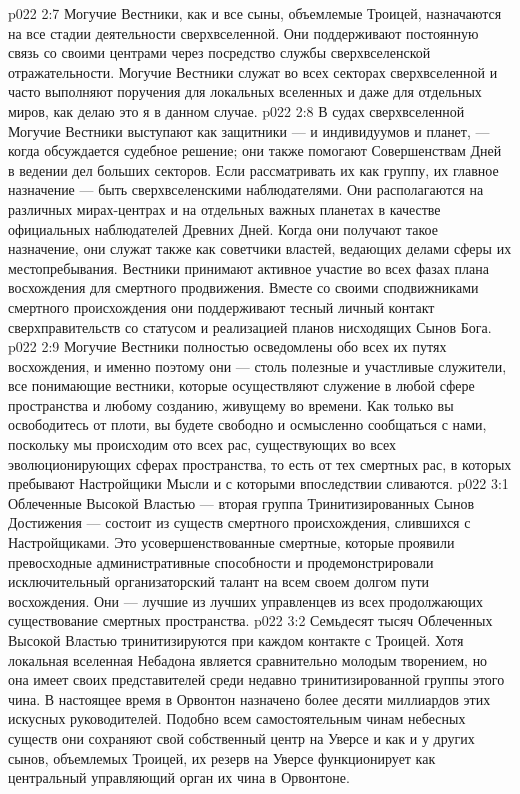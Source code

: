 \vs p022 2:7 \pc Могучие Вестники, как и все сыны, объемлемые Троицей, назначаются на все стадии деятельности сверхвселенной. Они поддерживают постоянную связь со своими центрами через посредство службы сверхвселенской отражательности. Могучие Вестники служат во всех секторах сверхвселенной и часто выполняют поручения для локальных вселенных и даже для отдельных миров, как делаю это я в данном случае.
\vs p022 2:8 В судах сверхвселенной Могучие Вестники выступают как защитники --- и индивидуумов и планет, --- когда обсуждается судебное решение; они также помогают Совершенствам Дней в ведении дел больших секторов. Если рассматривать их как группу, их главное назначение --- быть сверхвселенскими наблюдателями. Они располагаются на различных мирах\hyp{}центрах и на отдельных важных планетах в качестве официальных наблюдателей Древних Дней. Когда они получают такое назначение, они служат также как советчики властей, ведающих делами сферы их местопребывания. Вестники принимают активное участие во всех фазах плана восхождения для смертного продвижения. Вместе со своими сподвижниками смертного происхождения они поддерживают тесный личный контакт сверхправительств со статусом и реализацией планов нисходящих Сынов Бога.
\vs p022 2:9 Могучие Вестники полностью осведомлены обо всех их путях восхождения, и именно поэтому они --- столь полезные и участливые служители, все понимающие вестники, которые осуществляют служение в любой сфере пространства и любому созданию, живущему во времени. Как только вы освободитесь от плоти, вы будете свободно и осмысленно сообщаться с нами, поскольку мы происходим ото всех рас, существующих во всех эволюционирующих сферах пространства, то есть от тех смертных рас, в которых пребывают Настройщики Мысли и с которыми впоследствии сливаются.
\vs p022 3:1 Облеченные Высокой Властью --- вторая группа Тринитизированных Сынов Достижения --- состоит из существ смертного происхождения, слившихся с Настройщиками. Это усовершенствованные смертные, которые проявили превосходные административные способности и продемонстрировали исключительный организаторский талант на всем своем долгом пути восхождения. Они --- лучшие из лучших управленцев из всех продолжающих существование смертных пространства.
\vs p022 3:2 Семьдесят тысяч Облеченных Высокой Властью тринитизируются при каждом контакте с Троицей. Хотя локальная вселенная Небадона является сравнительно молодым творением, но она имеет своих представителей среди недавно тринитизированной группы этого чина. В настоящее время в Орвонтон назначено более десяти миллиардов этих искусных руководителей. Подобно всем самостоятельным чинам небесных существ они сохраняют свой собственный центр на Уверсе и как и у других сынов, объемлемых Троицей, их резерв на Уверсе функционирует как центральный управляющий орган их чина в Орвонтоне.
